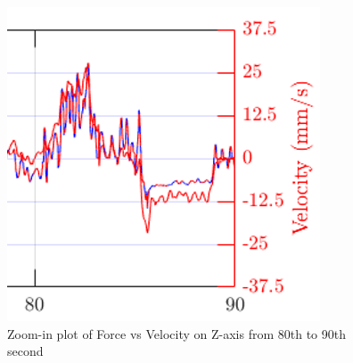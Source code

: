 \begin{figure}[htbp]
\begin{center}
\includegraphics[width=0.6\linewidth]{Images/exp/zoom_in.png}
\caption{Zoom-in plot of Force vs Velocity on Z-axis from 80th to 90th second}
\label{fig: zoom_in}
\end{center}
\end{figure}



